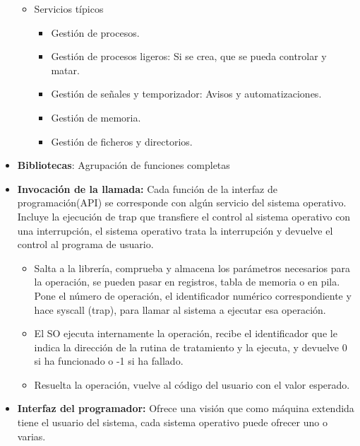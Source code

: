 \documentclass[12pt, twoside, openright]{report} %
\begin{document}
\begin{itemize}
\begin{itemize}
  \item Servicios típicos
    

    \begin{itemize}
    \item Gestión de procesos.
      
    \item Gestión de procesos ligeros: Si se crea, que se pueda controlar y
      matar.
      
    \item Gestión de señales y temporizador: Avisos y automatizaciones.
      
    \item Gestión de memoria.
      
    \item Gestión de ficheros y directorios.
      
    \end{itemize}
  \end{itemize}
\item \textbf{Bibliotecas}: Agrupación de funciones completas
  
\item \textbf{Invocación de la llamada:} Cada función de la interfaz de
  programación(API) se corresponde con algún servicio del sistema
  operativo. Incluye la ejecución de trap que transfiere el control al
  sistema operativo con una interrupción, el sistema operativo trata la
  interrupción y devuelve el control al programa de usuario.
  

  \begin{itemize}
  \item Salta a la librería, comprueba y almacena los parámetros necesarios
    para la operación, se pueden pasar en registros, tabla de memoria o
    en pila. Pone el número de operación, el identificador numérico
    correspondiente y hace syscall (trap), para llamar al sistema a
    ejecutar esa operación.
    
  \item El SO ejecuta internamente la operación, recibe el identificador que
    le indica la dirección de la rutina de tratamiento y la ejecuta, y
    devuelve 0 si ha funcionado o -1 si ha fallado.
    
  \item Resuelta la operación, vuelve al código del usuario con el valor
    esperado.
    
  \end{itemize}
\item \textbf{Interfaz del programador:} Ofrece una visión que como máquina
  extendida tiene el usuario del sistema, cada sistema operativo puede
  ofrecer uno o varias.
  

\end{itemize}
\end{document}
